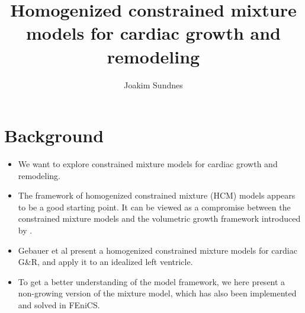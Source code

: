 \documentclass[twoside,12pt,a4paper]{article}
\title{Homogenized constrained mixture models for cardiac growth and remodeling}
\author{Joakim Sundnes}
\begin{document}
\maketitle

\section{Background}
\begin{itemize}
  \item We want to explore constrained mixture models for cardiac growth and remodeling. 
  \item The framework of homogenized constrained mixture (HCM) models \cite{cyron2016homogenized,braeu2017homogenized} 
        appears to be a good starting point. It can be viewed as a compromise between the constrained mixture models
        and the volumetric growth framework introduced by \cite{rodriguez1994stress}.
  \item Gebauer et al \cite{gebauer2022homogenized} present a homogenized constrained mixture models for cardiac G{\&}R, and apply 
        it to an idealized left ventricle.
  \item To get a better understanding of the model framework, we here present a non-growing version of the mixture model, which
        has also been implemented and solved in FEniCS. 
\end{itemize}
\end{document}
